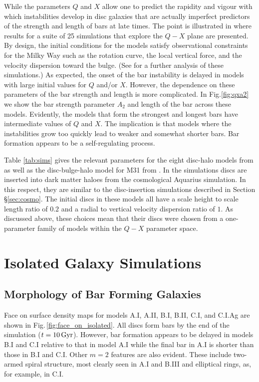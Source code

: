 While the parameters $Q$ and $X$ allow one to predict the rapidity and
vigour with which instabilities develop in disc galaxies that are
actually imperfect predictors of the strength and length of bars at
late times.  The point is illustrated in \citet{WPDGalactICSReference}
where results for a suite of 25 simulations that explore the $Q-X$
plane are presented.  By design, the initial conditions for the models
satisfy observational constraints for the Milky Way such as the
rotation curve, the local vertical force, and the velocity dispersion
toward the bulge.  (See \citet{hartmann2014} for a further analysis of
these simulations.)  As expected, the onset of the bar instability is
delayed in models with large initial values for $Q$ and/or $X$.
However, the dependence on these parameters of the bar strength and
length is more complicated.  In Fig.\ref{fig:qxa2} we show the bar
strength parameter $A_2$ and length of the bar across these models.
Evidently, the models that form the strongest and longest bars have
intermediate values of $Q$ and $X$.  The implication is that models
where the instabilities grow too quickly lead to weaker and somewhat
shorter bars.  Bar formation appears to be a self-regulating process.

Table \ref{tab:sims} gives the relevant parameters for the eight
disc-halo models from \citet{YurinSpringelStellarDisks} as well as the
disc-bulge-halo model for M31 from \citet{gauthier2006}.  In the
\citet{YurinSpringelStellarDisks} simulations discs are inserted into
dark matter haloes from the cosmological Aquarius simulation.  In this
respect, they are similar to the disc-insertion simulations described
in Section \S \ref{sec:cosmo}.  The initial discs in these models all
have a scale height to scale length ratio of $0.2$ and a radial to
vertical velocity dispersion ratio of $1$.  As discussed above, these
choices mean that their discs were chosen from a one-parameter family
of models within the $Q-X$ parameter space.

\section{Isolated Galaxy Simulations}\label{sec:isolated}

\subsection{Morphology of Bar Forming Galaxies}

Face on surface density maps for models A.I, A.II, B.I, B.II, C.I, and
C.I.Ag are shown in Fig.\,\ref{fig:face_on_isolated}.  All discs form
bars by the end of the simulation ($t=10\,{\rm Gyr}$).  However, bar
formation appears to be delayed in models B.I and C.I relative to that
in model A.I while the final bar in A.I is shorter than those in B.I
and C.I.  Other $m=2$ features are also evident.  These include
two-armed spiral structure, most clearly seen in A.I and B.III and
elliptical rings, as, for example, in C.I.

